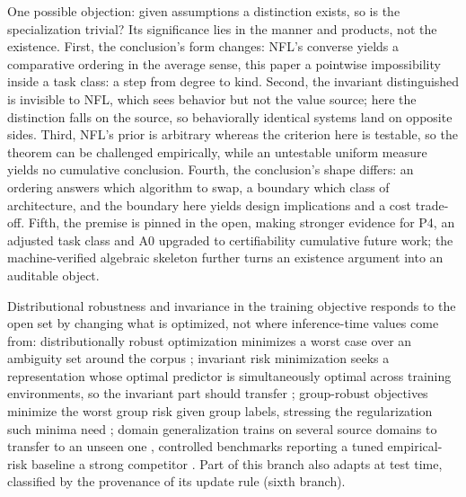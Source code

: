 One possible objection: given assumptions a distinction exists, so is the specialization trivial? Its significance lies in the manner and products, not the existence. First, the conclusion's form changes: NFL's converse yields a comparative ordering in the average sense, this paper a pointwise impossibility inside a task class: a step from degree to kind. Second, the invariant distinguished is invisible to NFL, which sees behavior but not the value source; here the distinction falls on the source, so behaviorally identical systems land on opposite sides. Third, NFL's prior is arbitrary whereas the criterion here is testable, so the theorem can be challenged empirically, while an untestable uniform measure yields no cumulative conclusion. Fourth, the conclusion's shape differs: an ordering answers which algorithm to swap, a boundary which class of architecture, and the boundary here yields design implications and a cost trade-off. Fifth, the premise is pinned in the open, making stronger evidence for P4, an adjusted task class and A0 upgraded to certifiability cumulative future work; the machine-verified algebraic skeleton further turns an existence argument into an auditable object.

Distributional robustness and invariance in the training objective responds to the open set by changing what is optimized, not where inference-time values come from: distributionally robust optimization minimizes a worst case over an ambiguity set around the corpus \citep{bental2013,rahimian2022}; invariant risk minimization seeks a representation whose optimal predictor is simultaneously optimal across training environments, so the invariant part should transfer \citep{arjovsky2019}; group-robust objectives minimize the worst group risk given group labels, stressing the regularization such minima need \citep{sagawa2020}; domain generalization trains on several source domains to transfer to an unseen one \citep{zhou2022}, controlled benchmarks reporting a tuned empirical-risk baseline a strong competitor \citep{gulrajani2021}. Part of this branch also adapts at test time, classified by the provenance of its update rule (sixth branch).

